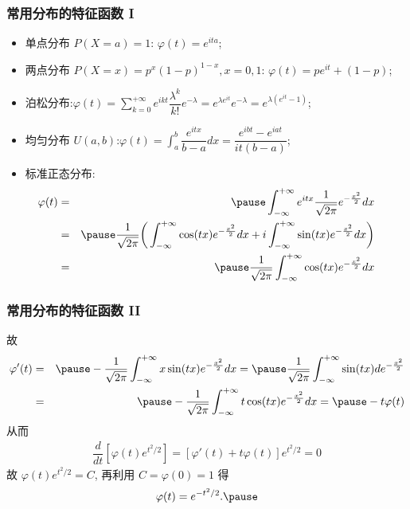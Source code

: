 \documentclass[Prob-All.tex]{subfiles}
\begin{document}
\begin{frame}%
	\frametitle{常用分布的特征函数  I}
	\begin{itemize}[<+-|alert@+>]
		\item 单点分布 $P (X=a)=1$: $\varphi (t)=e^{ita}$;
		\item 两点分布  $P (X=x)=p^x (1-p)^{1-x}, x=0,1$: $\varphi (t)=pe^{it}+(1-p)$;
		\item 泊松分布:$\varphi (t)=\sum_{k=0}^{+\infty} e^{ikt}\dfrac{\lambda^k}{k!} e^{-\lambda}=e^{\lambda e^{it}} e^{-\lambda}=e^{\lambda (e^{it}-1)}$;
		\item 均匀分布 $U (a,b)$:$\varphi (t)=\int_a^b\dfrac{e^{itx}}{b-a} dx=\dfrac{e^{ibt}-e^{iat}}{it (b-a)}$;
		\item 标准正态分布:
		\begin{eqnarray*}
			\hspace{-1cm}\varphi(t)&=&\pause \int_{-\infty}^{+\infty}e^{itx}\dfrac{1}{\sqrt{2\pi}}e^{-\frac{x^2}{2}}dx\\
			&=&\pause \dfrac{1}{\sqrt{2\pi}}\bigg(\int_{-\infty}^{+\infty}\cos(tx) e^{-\frac{x^2}{2}}dx+i\int_{-\infty}^{+\infty}\sin(tx) e^{-\frac{x^2}{2}}dx\bigg)\\
			\hspace{-1cm}&=&\pause \dfrac{1}{\sqrt{2\pi}}\int_{-\infty}^{+\infty}\cos(tx) e^{-\frac{x^2}{2}}dx
		\end{eqnarray*}\pause
	\end{itemize}
\end{frame}
\begin{frame}%
	\frametitle{常用分布的特征函数  II}
	故 \begin{eqnarray*}
		\varphi'(t)&=&\pause -\dfrac{1}{\sqrt{2\pi}}\int_{-\infty}^{+\infty}x\sin(tx) e^{-\frac{x^2}{2}}dx=\pause \dfrac{1}{\sqrt{2\pi}}\int_{-\infty}^{+\infty}\sin(tx) de^{-\frac{x^2}{2}}\\
		&=&\pause -\dfrac{1}{\sqrt{2\pi}}\int_{-\infty}^{+\infty}t\cos(tx) e^{-\frac{x^2}{2}}dx=\pause -t\varphi(t)
	\end{eqnarray*}
	\pause 从而
	\begin{eqnarray*}
		\dfrac{d}{dt}[\varphi(t)e^{t^2/2}]=[\varphi'(t)+t\varphi(t)]e^{t^2/2}=0
	\end{eqnarray*}
	\pause 故 $\varphi (t) e^{t^2/2}=C$, 再利用 $C=\varphi (0)=1$ 得
	\begin{eqnarray*}
		\varphi(t)=e^{-t^2/2}.\pause
	\end{eqnarray*}
\end{frame}
\end{document}
